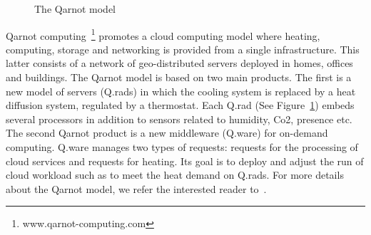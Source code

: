 \documentclass[10pt, conference, compsocconf]{IEEEtran}
\begin{document}
	\begin{figure}[htbp]
	\centering
	\caption{The Qarnot model}
	\label{fig:digital}
	\end{figure}


Qarnot computing~\footnote{www.qarnot-computing.com} promotes a cloud computing model where heating, computing, 
storage and networking is provided from a 
single infrastructure. This latter consists of a network of geo-distributed servers deployed in homes, offices and buildings. 
The Qarnot model is based on two main products. The first is a new model of servers (Q.rads) in which the cooling system is replaced by a 
heat diffusion system, regulated by a thermostat. Each Q.rad (See Figure~\ref{fig:digital}) embeds several processors in addition to sensors 
related to humidity, Co2, presence etc. The second Qarnot product is a new middleware (Q.ware) for on-demand computing. Q.ware manages 
two types of requests: requests for the processing of cloud services  and requests for heating. Its goal is to deploy and 
adjust the run of cloud workload such as to meet the heat demand on Q.rads. For more details about the Qarnot model, we refer the interested 
reader to~\cite{DBLP:conf/europar/Ngoko16}. 
\end{document}
